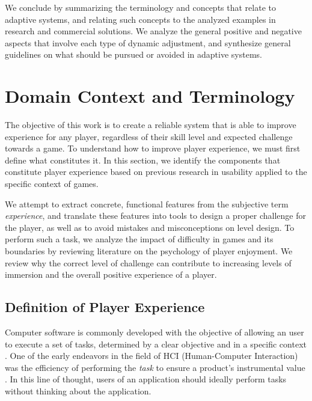 We conclude by summarizing the terminology and concepts that relate to adaptive systems, and relating such concepts to the analyzed examples in research and commercial solutions.  We analyze the general positive and negative aspects that involve each type of dynamic adjustment, and synthesize general guidelines on what should be pursued or avoided in adaptive systems.

\section{Domain Context and Terminology}

The objective of this work is to create a reliable system that is able to improve experience for any player, regardless of their skill level and expected challenge towards a game. To understand how to improve player experience, we must first define what constitutes it. In this section, we identify the components that constitute player experience based on previous research in usability applied to the specific context of games. 

We attempt to extract concrete, functional features from the subjective term \emph{experience}, and translate these features into tools to design a proper challenge for the player, as well as to avoid mistakes and misconceptions on level design. To perform such a task, we analyze the impact of difficulty in games and its boundaries by reviewing literature on the psychology of player enjoyment. We review why the correct level of challenge can contribute to increasing levels of immersion and the overall positive experience of a player.

\subsection{Definition of Player Experience}

Computer software is commonly developed with the objective of allowing an user to execute a set of tasks, determined by a clear objective and in a specific context \cite{ARTICLE_FromUsabilityToPlayability}. One of the early endeavors in the field of HCI (Human-Computer Interaction) was the efficiency of performing the \emph{task} to ensure a product's instrumental value \cite{ARTICLE_UserExperienceAResearchAgenda}. In this line of thought, users of an application should ideally perform tasks without thinking about the application. 


